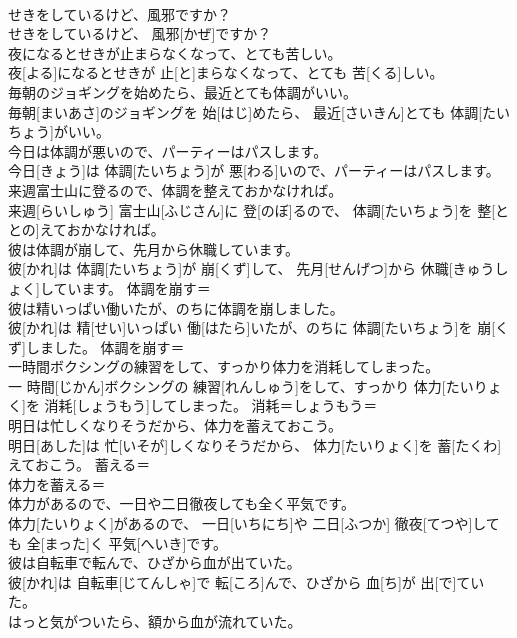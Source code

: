 \documentclass[8pt]{extreport}
\begin{document}
\begin{CJK}{UTF8}{min}
\\	せきをしているけど、風邪ですか？	
\\	せきをしているけど、 風邪[かぜ]ですか？	
\\	夜になるとせきが止まらなくなって、とても苦しい。	
\\	夜[よる]になるとせきが 止[と]まらなくなって、とても 苦[くる]しい。	
\\	毎朝のジョギングを始めたら、最近とても体調がいい。	
\\	毎朝[まいあさ]のジョギングを 始[はじ]めたら、 最近[さいきん]とても 体調[たいちょう]がいい。	
\\	今日は体調が悪いので、パーティーはパスします。	
\\	今日[きょう]は 体調[たいちょう]が 悪[わる]いので、パーティーはパスします。	
\\	来週富士山に登るので、体調を整えておかなければ。	
\\	来週[らいしゅう] 富士山[ふじさん]に 登[のぼ]るので、 体調[たいちょう]を 整[ととの]えておかなければ。	
\\	彼は体調が崩して、先月から休職しています。	
\\	彼[かれ]は 体調[たいちょう]が 崩[くず]して、 先月[せんげつ]から 休職[きゅうしょく]しています。	体調を崩す＝ 
\\	彼は精いっぱい働いたが、のちに体調を崩しました。	
\\	彼[かれ]は 精[せい]いっぱい 働[はたら]いたが、のちに 体調[たいちょう]を 崩[くず]しました。	体調を崩す＝ 
\\	一時間ボクシングの練習をして、すっかり体力を消耗してしまった。	
\\	一 時間[じかん]ボクシングの 練習[れんしゅう]をして、すっかり 体力[たいりょく]を 消耗[しょうもう]してしまった。	消耗＝しょうもう＝ 
\\	明日は忙しくなりそうだから、体力を蓄えておこう。	
\\	明日[あした]は 忙[いそが]しくなりそうだから、 体力[たいりょく]を 蓄[たくわ]えておこう。	蓄える＝ 
\\	体力を蓄える＝ 
\\	体力があるので、一日や二日徹夜しても全く平気です。	
\\	体力[たいりょく]があるので、 一日[いちにち]や 二日[ふつか] 徹夜[てつや]しても 全[まった]く 平気[へいき]です。	
\\	彼は自転車で転んで、ひざから血が出ていた。	
\\	彼[かれ]は 自転車[じてんしゃ]で 転[ころ]んで、ひざから 血[ち]が 出[で]ていた。	
\\	はっと気がついたら、額から血が流れていた。	

\end{CJK}
\end{document}
